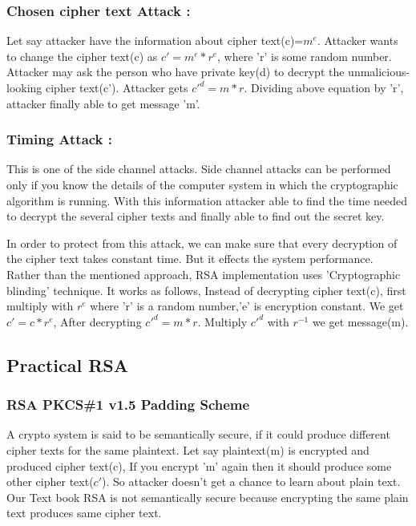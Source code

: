 \documentclass{article}
\begin{document}
 \subsubsection{Chosen cipher text Attack :}
 Let say attacker have the information about cipher text(c)=$m^{e}$. Attacker wants to change the cipher text(c) as $c'=m^{e}*r^{e}$, where 'r' is some random number. Attacker may ask the person who have private key(d) to decrypt the unmalicious-looking cipher text(c'). Attacker gets $c'^{d}=m*r$. Dividing above equation by 'r', attacker finally able to get message 'm'.
  
 \subsubsection{Timing Attack :}
 This is one of the side channel attacks. Side channel attacks can be performed only if you know the details of the computer system in which the cryptographic algorithm is running.
 With this information attacker able to find the time needed to decrypt the several cipher texts and finally able to find out the secret key.
 
 In order to protect from this attack, we can make sure that every decryption of the cipher text takes constant time. But it effects the system performance. Rather than the mentioned approach, RSA implementation uses 'Cryptographic blinding' technique. It works as follows, Instead of decrypting cipher text(c), first multiply with $r^{e}$ where 'r' is a random number,'e' is encryption constant. We get $c'=c*r^{e}$, After decrypting $c'^{d}=m*r$. Multiply $c'^{d} $ with $r^{-1}$ we get message(m).
 
 \subsection{Practical RSA}
 
 \subsubsection{RSA PKCS\#1 v1.5 Padding Scheme }
 A crypto system is said to be semantically secure, if it could produce different cipher texts for the same plaintext. Let say plaintext(m) is encrypted and produced cipher text(c), If you encrypt 'm' again then it should produce some other cipher text($c'$). So attacker doesn't get a chance to learn about plain text. Our Text book RSA is not semantically secure because encrypting the same plain text produces same cipher text.
 
\end{document}
